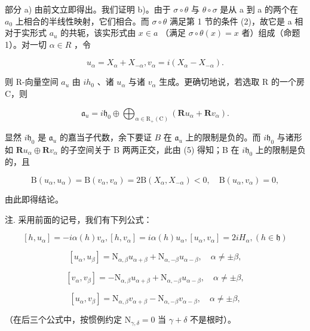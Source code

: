 部分 a) 由前文立即得出。我们证明 b)。由于 \(\sigma\circ\theta\) 与 \(\theta\circ\sigma\) 是从 a 到 a 的两个在 \(a_{0}\) 上相合的半线性映射，它们相合。而 \(\sigma\circ\theta\) 满足第 1 节的条件 (2)，故它是 a 相对于实形式 \(a_{u}\) 的共轭，该实形式由 \(x\in a\) （满足 \(\sigma\circ\theta(x)=x\) 者）组成（命题 1）。对一切 \(\alpha\in R\) ，令

\[
u _ {\alpha} = X _ {\alpha} + X _ {- \alpha}, v _ {\alpha} = i (X _ {\alpha} - X _ {- \alpha}).\tag{6}
\]

则 R-向量空间 \(a_{u}\) 由 \(ih_{0}\) 、诸 \(u_{\alpha}\) 与诸 \(v_{\alpha}\) 生成。更确切地说，若选取 R 的一个房 C，则

\[
\mathfrak {a} _ {u} = i \mathfrak {h} _ {0} \oplus \bigoplus_ {\alpha \in \mathrm{R} _ {+} (\mathrm{C})} \left(\mathbf {R} u _ {\alpha} + \mathbf {R} v _ {\alpha}\right).\tag{7}
\]

显然 \(i\mathfrak{h}_0\) 是 \(\mathfrak{a}_u\) 的嘉当子代数，余下要证 \(B\) 在 \(\mathfrak{a}_u\) 上的限制是负的。而 \(i\mathfrak{h}_0\) 与诸形如 \(\mathbf{R}u_{\alpha}\oplus \mathbf{R}v_{\alpha}\) 的子空间关于 B 两两正交，此由 (5) 得知；B 在 \(i\mathfrak{h}_0\) 上的限制是负的，且

\[
\mathrm{B} (u _ {\alpha}, u _ {\alpha}) = \mathrm{B} (v _ {\alpha}, v _ {\alpha}) = 2 \mathrm{B} (X _ {\alpha}, X _ {- \alpha}) <   0, \quad \mathrm{B} (u _ {\alpha}, v _ {\alpha}) = 0,\tag{8}
\]

由此即得结论。

注. 采用前面的记号，我们有下列公式：

\[
[ h, u _ {\alpha} ] = - i \alpha (h) v _ {\alpha}, [ h, v _ {\alpha} ] = i \alpha (h) u _ {\alpha}, [ u _ {\alpha}, v _ {\alpha} ] = 2 i H _ {\alpha}, (h \in \mathfrak {h})\tag{9}
\]

\[
[ u _ {\alpha}, u _ {\beta} ] = \mathrm{N} _ {\alpha , \beta} u _ {\alpha + \beta} + \mathrm{N} _ {\alpha , - \beta} u _ {\alpha - \beta}, \quad \alpha \neq \pm \beta ,\tag{10}
\]

\[
[ v _ {\alpha}, v _ {\beta} ] = - \mathrm{N} _ {\alpha , \beta} u _ {\alpha + \beta} + \mathrm{N} _ {\alpha , - \beta} u _ {\alpha - \beta}, \quad \alpha \neq \pm \beta ,\tag{11}
\]

\[
[ u _ {\alpha}, v _ {\beta} ] = \mathrm{N} _ {\alpha , \beta} v _ {\alpha + \beta} - \mathrm{N} _ {\alpha , - \beta} v _ {\alpha - \beta}, \quad \alpha \neq \pm \beta ,\tag{12}
\]

（在后三个公式中，按惯例约定 \(\mathrm{N}_{\gamma, \delta} = 0\) 当 \(\gamma + \delta\) 不是根时）。

